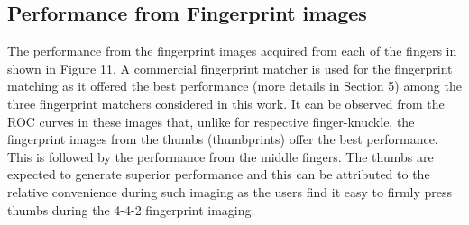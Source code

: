 \subsection{Performance from Fingerprint images}

The performance from the fingerprint images acquired from each of the fingers in shown in Figure 11. A commercial fingerprint matcher is used for the fingerprint matching as it offered the best performance (more details in Section 5) among the three fingerprint matchers considered in this work. It can be observed from the ROC curves in these images that, unlike for respective finger-knuckle, the fingerprint images from the thumbs (thumbprints) offer the best performance. This is followed by the performance from the middle fingers. The thumbs are expected to generate superior performance and this can be attributed to the relative convenience during such imaging as the users find it easy to firmly press thumbs during the 4-4-2 fingerprint imaging. 